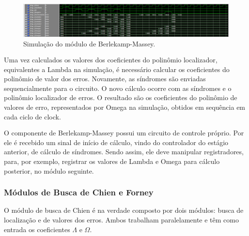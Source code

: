 	\begin{figure}[!htb]
		\caption{\label{fig_berlekamp_sim}Simulação do módulo de Berlekamp-Massey.}
		\centering
		\includegraphics[width=1\textwidth]{RS/Sim_berlekamp.PNG}
		\legend{}
	\end{figure}
	
	Uma vez calculados os valores dos coeficientes do polinômio localizador, equivalentes a Lambda na simulação, é necessário calcular os coeficientes do polinômio de valor dos erros. Novamente, as síndromes são enviadas sequencialmente para o circuito. O novo cálculo ocorre com as síndromes e o polinômio localizador de erros. O resultado são os coeficientes do polinômio de valores de erro, representados por Omega na simulação, obtidos em sequência em cada ciclo de clock. 
	
	O componente de Berlekamp-Massey possui um circuito de controle próprio. Por ele é recebido um sinal de início de cálculo, vindo do controlador do estágio anterior, de cálculo de síndromes. Sendo assim, ele deve manipular registradores, para, por exemplo, registrar os valores de Lambda e Omega para cálculo posterior, no módulo seguinte.
	
	\subsubsection{Módulos de Busca de Chien e Forney}
	
	O módulo de busca de Chien é na verdade composto por dois módulos: busca de localização e de valores dos erros. Ambos trabalham paralelamente e têm como entrada os coeficientes $\Lambda$ e $\Omega$. 
	

